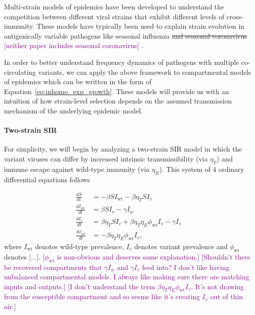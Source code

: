 \documentclass[12pt,oneside,letterpaper]{article}
\newcommand{\wt}{\text{wt}}
\def\tbc#1{\textcolor{purple}{[#1]}}
\begin{document}
Multi-strain models of epidemics have been developed to understand the competition between different viral strains that exhibit different levels of cross-immunity.
These models have typically been used to explain strain evolution in antigenically variable pathogens like seasonal influenza \sout{and seasonal coronavirus} \tbc{neither paper includes seasonal coronavirus} \cite{Gog2002, Wen2022}.

In order to better understand frequency dynamics of pathogens with multiple co-circulating variants, we can apply the above framework to compartmental models of epidemics which can be written in the form of Equation~\ref{eq:inhomo_exp_growth}.
These models will provide us with an intuition of how strain-level selection depends on the assumed transmission mechanism of the underlying epidemic model.

\paragraph{Two-strain SIR}%

For simplicity, we will begin by analyzing a two-strain SIR model in which the variant viruses can differ by increased intrinsic transmissibility (via $\eta_{T}$) and immune escape against wild-type immunity (via $\eta_{E}$).
This system of 4 ordinary differential equations follows

\begin{align*}
    \frac{d S}{d t} &= - \beta S I_{\wt} - \beta \eta_{T} S I_{v}\\
    \frac{d I_{\wt}}{dt} &= \beta S I_{v} - \gamma I_{w}\\
    \frac{d I_{v}}{dt} &= \beta \eta_{T} S I_{v} + \beta \eta_{T} \eta_{E} \phi_{\wt} I_{v} - \gamma I_{v}\\
    \frac{d \phi_{\wt}}{dt} &= - \beta \eta_{T} \eta_{E} \phi_{\wt} I_{v},
\end{align*}
where $I_{\wt}$ denotes wild-type prevalence, $I_{v}$ denotes variant prevalence and $\phi_{\wt}$ denotes \tbc{...}.
\tbc{$\phi_{\wt}$ is non-obvious and deserves some explanation.}
\tbc{Shouldn't there be recovered compartments that $\gamma I_{w}$ and $\gamma I_{v}$ feed into? I don't like having unbalanced compartmental models. I always like making sure there are matching inputs and outputs.}
\tbc{I don't understand the term $\beta \eta_{T} \eta_{E} \phi_{\wt} I_{v}$. It's not drawing from the susceptible compartment and so seems like it's creating $I_{v}$ out of thin air.}
\end{document}

